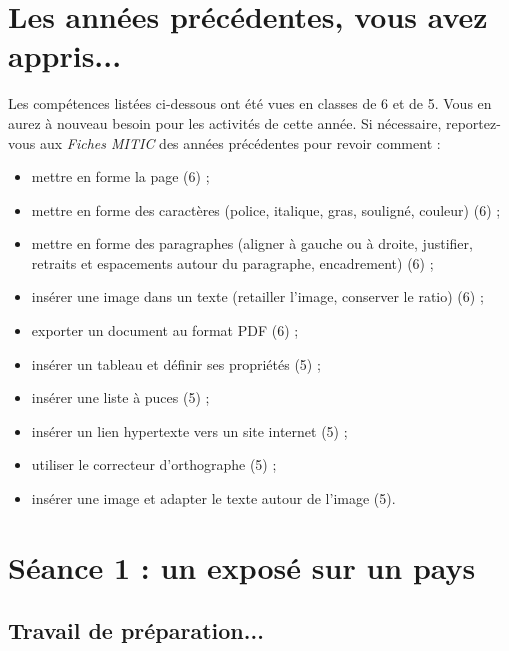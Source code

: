 \section*{Les années précédentes, vous avez appris...} %

\vspace{12pt}

Les compétences listées ci-dessous ont été vues en classes de 6 et de 5. Vous en aurez à nouveau besoin pour les activités de cette année. Si nécessaire, reportez-vous aux \emph{Fiches MITIC} des années précédentes pour revoir comment :  

\begin{itemize}
\item mettre en forme la page (6) ;
\item mettre en forme des caractères (police, italique, gras, souligné, couleur) (6) ;
\item mettre en forme des paragraphes (aligner à gauche ou à droite, justifier, retraits et espacements autour du paragraphe, encadrement) (6) ;
\item insérer une image dans un texte (retailler l'image, conserver le ratio) (6) ;
\item exporter un document au format PDF (6) ;
\item insérer un tableau et définir ses propriétés (5) ;
\item insérer une liste à puces (5) ;
\item insérer un lien hypertexte vers un site internet (5) ;
\item utiliser le correcteur d'orthographe (5) ;
\item insérer une image et adapter le texte autour de l'image (5).
\end{itemize}





%
%
%
%


\section{Séance 1 : un exposé sur un pays}\label{ficheTexte4e2}

\subsection{Travail de préparation...}

